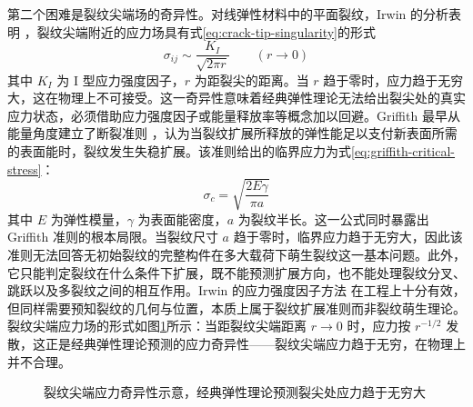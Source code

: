 第二个困难是裂纹尖端场的奇异性。对线弹性材料中的平面裂纹，Irwin 的分析表明 \cite{Irwin1957}，裂纹尖端附近的应力场具有式\eqref{eq:crack-tip-singularity}的形式
\begin{equation}
  \sigma_{ij}\sim\frac{K_I}{\sqrt{2\pi r}}\qquad(r\to 0)
  \label{eq:crack-tip-singularity}
\end{equation}
其中 $K_I$ 为 I 型应力强度因子，$r$ 为距裂尖的距离。当 $r$ 趋于零时，应力趋于无穷大，这在物理上不可接受。这一奇异性意味着经典弹性理论无法给出裂尖处的真实应力状态，必须借助应力强度因子或能量释放率等概念加以回避。Griffith 最早从能量角度建立了断裂准则 \cite{Griffith1921}，认为当裂纹扩展所释放的弹性能足以支付新表面所需的表面能时，裂纹发生失稳扩展。该准则给出的临界应力为式\eqref{eq:griffith-critical-stress}：
\begin{equation}
  \sigma_c=\sqrt{\frac{2E\gamma}{\pi a}}
  \label{eq:griffith-critical-stress}
\end{equation}
其中 $E$ 为弹性模量，$\gamma$ 为表面能密度，$a$ 为裂纹半长。这一公式同时暴露出 Griffith 准则的根本局限。当裂纹尺寸 $a$ 趋于零时，临界应力趋于无穷大，因此该准则无法回答无初始裂纹的完整构件在多大载荷下萌生裂纹这一基本问题。此外，它只能判定裂纹在什么条件下扩展，既不能预测扩展方向，也不能处理裂纹分叉、跳跃以及多裂纹之间的相互作用。Irwin 的应力强度因子方法 \cite{Irwin1957} 在工程上十分有效，但同样需要预知裂纹的几何与位置，本质上属于裂纹扩展准则而非裂纹萌生理论。裂纹尖端应力场的形式如图\ref{fig:crack-singularity}所示：当距裂纹尖端距离 $r \to 0$ 时，应力按 $r^{-1/2}$ 发散，这正是经典弹性理论预测的应力奇异性——裂纹尖端应力趋于无穷，在物理上并不合理。

\begin{figure}[htbp]
  \centering
  \caption{裂纹尖端应力奇异性示意，经典弹性理论预测裂尖处应力趋于无穷大}
  \label{fig:crack-singularity}
\end{figure}

